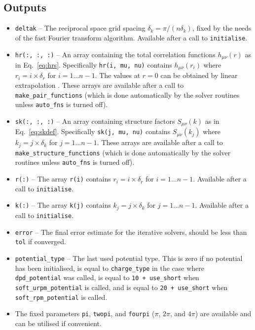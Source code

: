 \documentclass[12pt,a4paper]{article}
\newcommand{\Eqref}[1]{Eq.~\eqref{#1}}
\begin{document}
\subsection{Outputs}
%
\begin{itemize}
%
\item\verb+deltak+ -- The reciprocal space grid spacing
  $\delta_k=\pi/(n\delta_k)$, fixed by the needs of the fast Fourier
  transform algorithm.  Available after a call to \verb+initialise+.
%
\item\verb+hr(:, :, :)+ -- An array containing the total correlation
  functions $h_{\mu\nu}(r)$ as in \Eqref{eq:hrs}.  Specifically
  \verb+hr(i, mu, nu)+ contains $h_{\mu\nu}(r_i)$ where
  $r_i=i\times\delta_r$ for $i=1\dots n-1$.  The values at $r=0$ can
  be obtained by linear extrapolation \cite{KMP04}.  These arrays are
  available after a call to \verb+make_pair_functions+ (which is done
  automatically by the solver routines unless \verb+auto_fns+ is
  turned off).
%
\item\verb+sk(:, :, :)+ -- An array containing structure factors
  $S_{\mu\nu}(k)$ as in \Eqref{eq:skdef}.  Specifically
  \verb+sk(j, mu, nu)+ contains $S_{\mu\nu}(k_j)$ where
  $k_j=j\times\delta_k$ for $j=1\dots n-1$. These arrays are available
  after a call to \verb+make_structure_functions+ (which is done
  automatically by the solver routines unless \verb+auto_fns+ is
  turned off).
%
\item\verb+r(:)+ -- The array \verb+r(i)+ contains
  $r_i=i\times\delta_r$ for $i=1\dots n-1$.  Available after a call to
  \verb+initialise+.
%
\item\verb+k(:)+ -- The array \verb+k(j)+ contains
  $k_j=j\times\delta_k$ for $j=1\dots n-1$.  Available after a call to
  \verb+initialise+.
%
\item\verb+error+ -- The final error estimate for the iterative
  solvers, should be less than \verb+tol+ if converged.
%
\item\verb+potential_type+ -- The last used potential type. This is
  zero if no potential has been initialised, is equal to
  \verb+charge_type+ in the case where \verb+dpd_potential+ was
  called, is equal to \verb:10 + use_short: when
  \verb+soft_urpm_potential+ is called, and is equal to
  \verb:20 + use_short: when \verb+soft_rpm_potential+ is called.
%
\item The fixed parameters \verb+pi+, \verb+twopi+, and \verb+fourpi+ 
($\pi$, $2\pi$, and $4\pi$) are available and can be utilised if
convenient.
%
\end{itemize}
\end{document}
